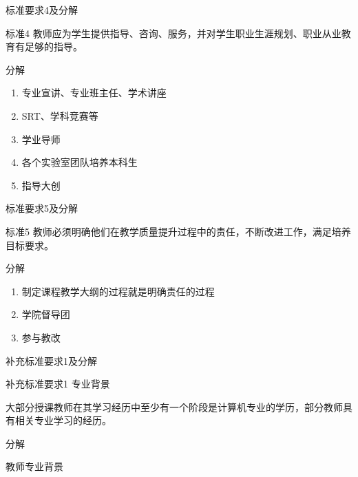 \documentclass{beamer}
\begin{document}
\begin{frame}{标准要求4及分解}
\begin{block}{标准4}
教师应为学生提供指导、咨询、服务，并对学生职业生涯规划、职业从业教育有足够的指导。
\end{block}
\begin{block}{分解}
\begin{enumerate}
\item
专业宣讲、专业班主任、学术讲座
\item
SRT、学科竞赛等

\item
学业导师
\item
各个实验室团队培养本科生
\item
指导大创

\end{enumerate}
\end{block}
\end{frame}

\begin{frame}{标准要求5及分解}
\begin{block}{标准5}
教师必须明确他们在教学质量提升过程中的责任，不断改进工作，满足培养目标要求。
\end{block}
\begin{block}{分解}
\begin{enumerate}
\item
制定课程教学大纲的过程就是明确责任的过程

\item
学院督导团
\item
参与教改

\end{enumerate}
\end{block}
\end{frame}

\begin{frame}{补充标准要求1及分解}
\begin{block}{补充标准要求1}
专业背景

大部分授课教师在其学习经历中至少有一个阶段是计算机专业的学历，部分教师具有相关专业学习的经历。
\end{block}
\begin{block}{分解}

教师专业背景

\end{block}
\end{frame}
\end{document}
